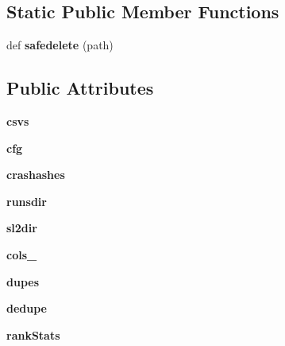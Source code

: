 \subsection*{Static Public Member Functions}
\begin{DoxyCompactItemize}
\item 
\mbox{\label{classpostprocess_1_1_rollup_a8e6d9aac4556096152b43f005f39a53d}} 
def {\bfseries safedelete} (path)
\end{DoxyCompactItemize}
\subsection*{Public Attributes}
\begin{DoxyCompactItemize}
\item 
\mbox{\label{classpostprocess_1_1_rollup_afbea98918804daa4be7f407911c27d04}} 
{\bfseries csvs}
\item 
\mbox{\label{classpostprocess_1_1_rollup_a077d8b6017db36829b3704de67e8eff7}} 
{\bfseries cfg}
\item 
\mbox{\label{classpostprocess_1_1_rollup_a635bf3ee393b599a52862eaff9f039ed}} 
{\bfseries crashashes}
\item 
\mbox{\label{classpostprocess_1_1_rollup_afb7b800c1c4638c67f98781f35774b2a}} 
{\bfseries runsdir}
\item 
\mbox{\label{classpostprocess_1_1_rollup_afd66320c263ab3a1135f094439833222}} 
{\bfseries sl2dir}
\item 
\mbox{\label{classpostprocess_1_1_rollup_aa8a05230a9000ce3d393f3e25d4bb4de}} 
{\bfseries cols\+\_\+}
\item 
\mbox{\label{classpostprocess_1_1_rollup_a21b762361d2ac58660822b016a4e402a}} 
{\bfseries dupes}
\item 
\mbox{\label{classpostprocess_1_1_rollup_acb9d36190c3acf25d5835af1fad2d654}} 
{\bfseries dedupe}
\item 
\mbox{\label{classpostprocess_1_1_rollup_a428e49831b1fc8e7b64fc41458368310}} 
{\bfseries rank\+Stats}
\end{DoxyCompactItemize}


